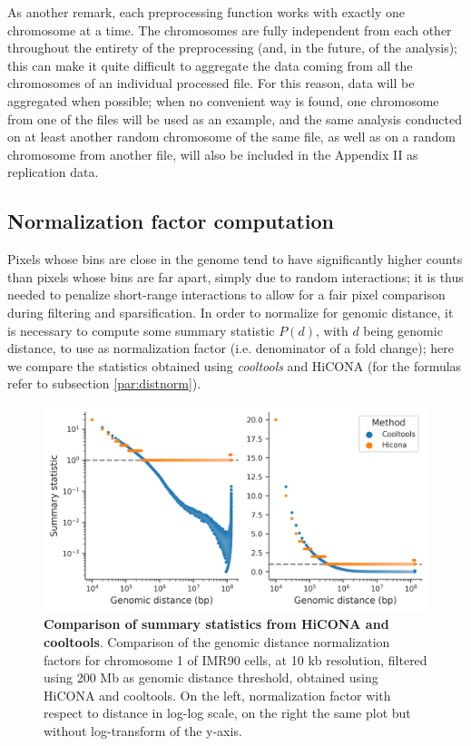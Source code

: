 As another remark, each preprocessing function works with exactly one chromosome at a time. The chromosomes are fully independent from each other throughout the entirety of the preprocessing (and, in the future, of the analysis); this can make it quite difficult to aggregate the data coming from all the chromosomes of an individual processed file. For this reason, data will be aggregated when possible; when no convenient way is found, one chromosome from one of the files will be used as an example, and the same analysis conducted on at least another random chromosome of the same file, as well as on a random chromosome from another file, will also be included in the Appendix II as replication data.

\subsection{Normalization factor computation}

Pixels whose bins are close in the genome tend to have significantly higher counts than pixels whose bins are far apart, simply due to random interactions; it is thus needed to penalize short-range interactions to allow for a fair pixel comparison during filtering and sparsification. In order to normalize for genomic distance, it is necessary to compute some summary statistic $P(d)$, with $d$ being genomic distance, to use as normalization factor (i.e. denominator of a fold change); here we compare the statistics obtained using \textit{cooltools} and HiCONA (for the formulas refer to subsection \ref{par:distnorm}). 

\begin{figure}[ht]
  \centering
  \includegraphics[width=1\textwidth]{hicona_vs_cooltools.png}
  \caption{\textbf{Comparison of summary statistics from HiCONA and cooltools}. Comparison of the genomic distance normalization factors for chromosome 1 of IMR90 cells, at 10 kb resolution, filtered using 200 Mb as genomic distance threshold, obtained using HiCONA and cooltools. On the left, normalization factor with respect to distance in log-log scale, on the right the same plot but without log-transform of the y-axis.}
  \label{fig:cooltools}
\end{figure}


